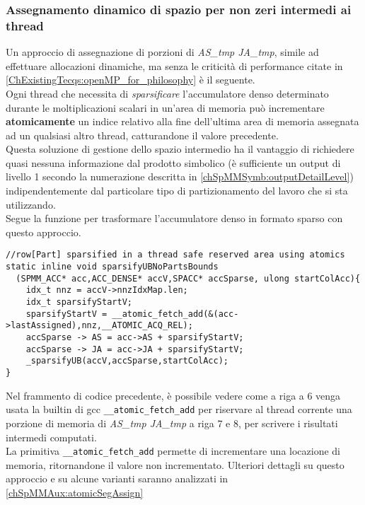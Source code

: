 \subsubsection[Assegnamento dinamico \\di spazio intermedio ai thread]
{Assegnamento dinamico di spazio per non zeri intermedi ai thread} \label{chSpMMNum:mallocReplaceAssigns}
Un approccio di assegnazione di porzioni di \emph{AS\_tmp JA\_tmp}, simile ad effettuare allocazioni 
dinamiche, ma senza le criticità di performance citate in \ref{ChExistingTecqs:openMP_for_philosophy}
è il seguente.\\
\label{chSpMMNum:sparsifyMallocReplace}
Ogni thread che necessita di \emph{sparsificare} l'accumulatore denso determinato durante 
le moltiplicazioni scalari in un'area di memoria può incrementare {\bf{atomicamente}} un 
indice relativo alla fine dell'ultima area di memoria assegnata ad un qualsiasi altro thread,
catturandone il valore precedente.\\
\label{chSpMMNum:sparsifyMallocReplace_EASY_INTEGRATION_IN_EVERY_UB_PARTITIONING}
Questa soluzione di gestione dello spazio intermedio ha il vantaggio di richiedere quasi
nessuna informazione dal prodotto simbolico (è sufficiente un output di livello 1 secondo la numerazione descritta in \ref{chSpMMSymb:outputDetailLevel})
indipendentemente dal particolare tipo di partizionamento del lavoro che si sta utilizzando.\\
Segue la funzione per trasformare l'accumulatore denso in formato sparso con questo approccio.\\
\begin{lstlisting}
//row[Part] sparsified in a thread safe reserved area using atomics
static inline void sparsifyUBNoPartsBounds
  (SPMM_ACC* acc,ACC_DENSE* accV,SPACC* accSparse, ulong startColAcc){
    idx_t nnz = accV->nnzIdxMap.len;
    idx_t sparsifyStartV;
    sparsifyStartV = __atomic_fetch_add(&(acc->lastAssigned),nnz,__ATOMIC_ACQ_REL); 
    accSparse -> AS = acc->AS + sparsifyStartV;
    accSparse -> JA = acc->JA + sparsifyStartV;
    _sparsifyUB(accV,accSparse,startColAcc);
}
\end{lstlisting}
Nel frammento di codice precedente, è possibile vedere come a riga a 6 venga usata
la builtin di gcc \verb|__atomic_fetch_add| \cite{gcc10.1}
per riservare al thread corrente una porzione di memoria di \emph{AS\_tmp JA\_tmp}
a riga 7 e 8, per scrivere i risultati intermedi computati.\\
La primitiva \verb|__atomic_fetch_add| permette di incrementare una locazione 
di memoria, ritornandone il valore non incrementato.
Ulteriori dettagli su questo approccio e su alcune varianti saranno analizzati in \ref{chSpMMAux:atomicSegAssign}

